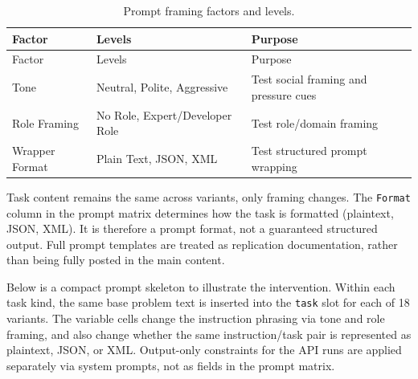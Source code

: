 \begin{longtable}[]{@{}
 >{\raggedright\arraybackslash}p{}
 >{\raggedright\arraybackslash}p{}
 >{\raggedright\arraybackslash}p{}@{}}
\caption{Prompt framing factors and levels.}\label{tab:prompt-factors}\tabularnewline
\toprule\noalign{}
\begin{minipage}[b]{\linewidth}\raggedright
Factor
\end{minipage} & \begin{minipage}[b]{\linewidth}\raggedright
Levels
\end{minipage} & \begin{minipage}[b]{\linewidth}\raggedright
Purpose
\end{minipage} \\
\midrule\noalign{}
\endfirsthead
\toprule\noalign{}
\begin{minipage}[b]{\linewidth}\raggedright
Factor
\end{minipage} & \begin{minipage}[b]{\linewidth}\raggedright
Levels
\end{minipage} & \begin{minipage}[b]{\linewidth}\raggedright
Purpose
\end{minipage} \\
\midrule\noalign{}
\endhead
\bottomrule\noalign{}
\endlastfoot
Tone & Neutral, Polite, Aggressive & Test social framing and pressure cues \\
Role Framing & No Role, Expert/Developer Role & Test role/domain framing \\
Wrapper Format & Plain Text, JSON, XML & Test structured prompt wrapping \\
\end{longtable}

Task content remains the same across variants, only framing changes. The \texttt{Format} column in the prompt matrix determines how the task is formatted (plaintext, JSON, XML). It is therefore a prompt format, not a guaranteed structured output. Full prompt templates are treated as replication documentation, rather than being fully posted in the main content.

Below is a compact prompt skeleton to illustrate the intervention. Within each task kind, the same base problem text is inserted into the \texttt{task} slot for each of 18 variants. The variable cells change the instruction phrasing via tone and role framing, and also change whether the same instruction/task pair is represented as plaintext, JSON, or XML. Output-only constraints for the API runs are applied separately via system prompts, not as fields in the prompt matrix.

